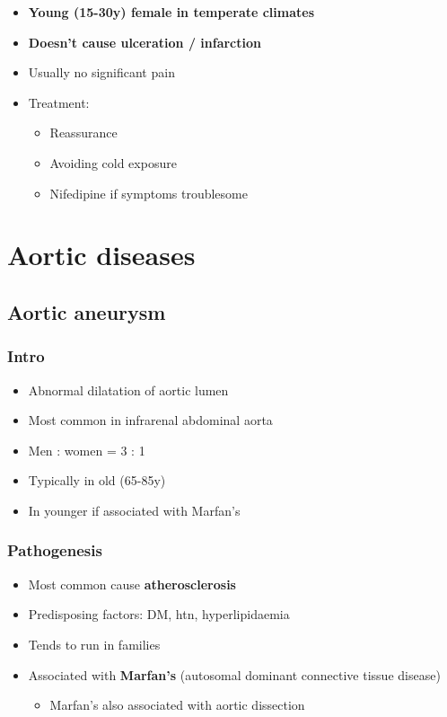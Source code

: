 \documentclass[
  12pt,
]{memoir}
\providecommand{\tightlist}{%
  \setlength{\itemsep}{0pt}\setlength{\parskip}{0pt}}
\begin{document}
\begin{itemize}
\tightlist
\item
  \textbf{Young (15-30y) female in temperate climates}
\item
  \textbf{Doesn't cause ulceration / infarction}
\item
  Usually no significant pain
\item
  Treatment:

  \begin{itemize}
  \tightlist
  \item
    Reassurance
  \item
    Avoiding cold exposure
  \item
    Nifedipine if symptoms troublesome
  \end{itemize}
\end{itemize}

\hypertarget{aortic-diseases}{%
\section{Aortic diseases}\label{aortic-diseases}}

\hypertarget{aortic-aneurysm}{%
\subsection{Aortic aneurysm}\label{aortic-aneurysm}}

\hypertarget{intro-4}{%
\subsubsection{Intro}\label{intro-4}}

\begin{itemize}
\tightlist
\item
  Abnormal dilatation of aortic lumen
\item
  Most common in infrarenal abdominal aorta
\item
  Men : women = 3 : 1
\item
  Typically in old (65-85y)
\item
  In younger if associated with Marfan's
\end{itemize}

\hypertarget{pathogenesis-2}{%
\subsubsection{Pathogenesis}\label{pathogenesis-2}}

\begin{itemize}
\tightlist
\item
  Most common cause \textbf{atherosclerosis}
\item
  Predisposing factors: DM, htn, hyperlipidaemia
\item
  Tends to run in families
\item
  Associated with \textbf{Marfan's} (autosomal dominant connective
  tissue disease)

  \begin{itemize}
  \tightlist
  \item
    Marfan's also associated with aortic dissection
  \end{itemize}
\end{itemize}
\end{document}
